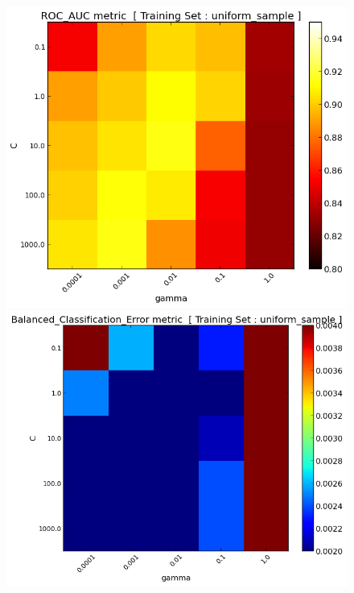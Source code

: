 \documentclass[final,3p,times,twocolumn]{elsarticle}
\begin{document}
\begin{figure}
\includegraphics[scale=0.51]{Images/ROC_AUC_uniform_sample_grid10.png} 
\includegraphics[scale=0.51]{Images/Balanced_Classification_Error_uniform_sample_grid10.png} 

\end{figure}
\end{document}
